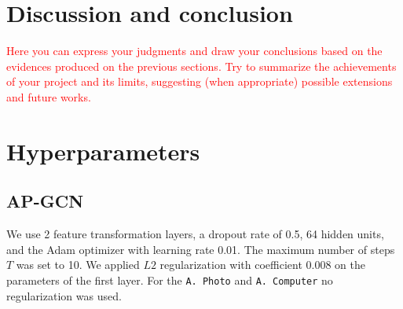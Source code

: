 \documentclass{gdl}
\begin{document}
\section{Discussion and conclusion}

\textcolor{red}{Here you can express your judgments and draw your conclusions based on the  evidences produced on the previous sections.
Try to summarize the achievements of your project and its limits, suggesting (when appropriate) possible extensions and future works.}

\clearpage


\clearpage

\appendix

\section{Hyperparameters}

\subsection{AP-GCN}
\label{lab:hyper-ap-gcn}
We use 2 feature transformation layers, a dropout rate of 0.5, 64 hidden units, and the Adam optimizer with learning rate 0.01. The maximum number of steps $T$ was set to 10. We applied $L2$ regularization with coefficient 0.008 on the parameters of the first layer. For the \texttt{A. Photo} and \texttt{A. Computer} no regularization was used.
\end{document}
